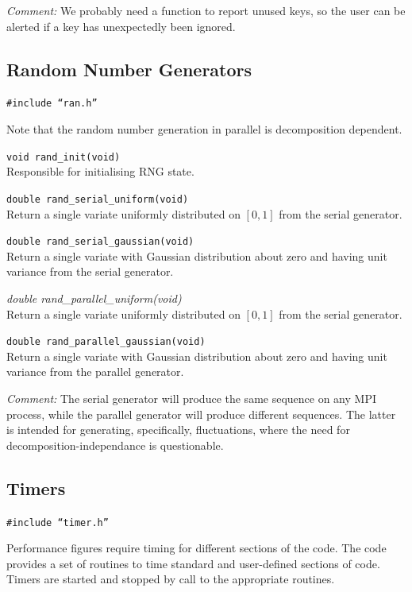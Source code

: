 \textit{Comment:} We probably need a function to report unused keys, so
the user can be alerted if a key has unexpectedly been ignored.


\subsection{Random Number Generators}

\texttt{\#include ``ran.h''}

Note that the random number generation in parallel is
decomposition dependent.

\texttt{void rand\_init(void)}\\
Responsible for initialising RNG state.

\texttt{double rand\_serial\_uniform(void)}\\
Return a single variate uniformly distributed on $[0,1]$ from
the serial generator.

\texttt{double rand\_serial\_gaussian(void)}\\
Return a single variate with Gaussian distribution about zero
and having unit variance from the serial generator.

\textit{double rand\_parallel\_uniform(void)}\\
Return a single variate uniformly distributed on $[0,1]$
from the serial generator.

\texttt{double rand\_parallel\_gaussian(void)}\\
Return a single variate with Gaussian distribution about zero
and having unit variance from the parallel generator.

\textit{Comment:} The serial generator will produce the
same sequence on any MPI process, while the parallel generator
will produce different sequences. The latter is intended for
generating, specifically, fluctuations, where the need for
decomposition-independance is questionable.



\subsection{Timers}

\texttt{\#include ``timer.h''}

Performance figures require timing for different sections
of the code. The code provides a set of routines to time
standard and user-defined sections of code. Timers are
started and stopped by call to the appropriate routines.

